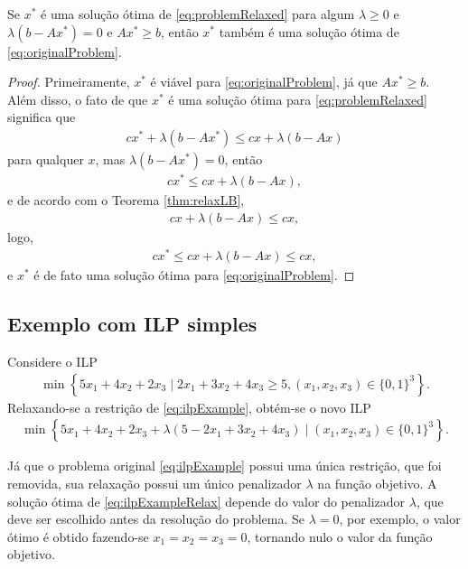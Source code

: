 {\begin{theorem}
	\label{thm:xIsOptimal}
	Se $x^*$ é uma solução ótima de \eqref{eq:problemRelaxed} para algum $\lambda \geq 0$ e $\lambda (b - Ax^*) = 0$ e $Ax^* \geq b$, então $x^*$ também é uma solução ótima de \eqref{eq:originalProblem}.
\end{theorem}
\begin{proof}
	Primeiramente, $x^*$ é viável para \eqref{eq:originalProblem}, já que $Ax^* \geq b$. Além disso, o fato de que $x^*$ é uma solução ótima para \eqref{eq:problemRelaxed} significa que
	\begin{align*}
		cx^* + \lambda (b - Ax^*) \leq cx + \lambda (b - Ax)
	\end{align*}
	para qualquer $x$, mas $\lambda (b - Ax^*) = 0$, então
	\begin{align*}
		cx^* \leq cx + \lambda (b - Ax),
	\end{align*}
	e de acordo com o Teorema \ref{thm:relaxLB}, 
	\begin{align*}
		cx + \lambda (b - Ax) \leq cx,
	\end{align*}
	logo,
	\begin{align*}
		cx^* \leq cx + \lambda (b - Ax) \leq cx,
	\end{align*}
	e $x^*$ é de fato uma solução ótima para \eqref{eq:originalProblem}.
\end{proof}

\subsection{Exemplo com ILP simples}

Considere o ILP 
\begin{align*}
	\min \left\{ 5x_1 + 4x_2 + 2x_3 \mid 2x_1 + 3x_2 + 4x_3 \geq 5, (x_1,x_2,x_3) \in \{0,1\}^3 \right\}. \tag{P1}\label{eq:ilpExample}
\end{align*}
Relaxando-se a restrição de \eqref{eq:ilpExample}, obtém-se o novo ILP
\begin{align*}
	\min \left\{ 5x_1 + 4x_2 + 2x_3 + \lambda(5 - 2x_1 + 3x_2 + 4x_3) \mid (x_1,x_2,x_3) \in \{0,1\}^3 \right\}. \tag{PR$_\lambda$1}\label{eq:ilpExampleRelax}
\end{align*} 

Já que o problema original \eqref{eq:ilpExample} possui uma única restrição, que foi removida, sua relaxação possui um único penalizador $\lambda$ na função objetivo. A solução ótima de \eqref{eq:ilpExampleRelax} depende do valor do penalizador $\lambda$, que deve ser escolhido antes da resolução do problema. Se $\lambda = 0$, por exemplo, o valor ótimo é obtido fazendo-se $x_1 = x_2 = x_3 = 0$, tornando nulo o valor da função objetivo.

}
